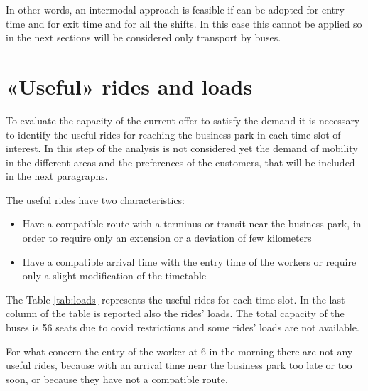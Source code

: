 In other words, an intermodal approach is feasible if can be adopted for entry time and for exit time and for all the shifts. In this case this cannot be applied so in the next sections will be considered only transport by buses.
\newpage
\begin{figure}[!h]
\centering
{}\hfill


\end{figure}
\newpage

\section{«Useful» rides and loads}

To evaluate the capacity of the current offer to satisfy the demand it is necessary to identify the useful rides for reaching the business park in each time slot of interest.
In this step of the analysis is not considered yet the demand of mobility in the different areas and the preferences of the customers, that will be included in the next paragraphs.

The useful rides have two characteristics:

\begin{itemize}
    \item Have a compatible route with a terminus or transit near the business park, in order to require only an extension or a deviation of few kilometers
    \item Have a compatible arrival time with the entry time of the workers or require only a slight modification of the timetable
\end{itemize}

The Table \ref{tab:loads} represents the useful rides for each time slot. In the last column of the table is reported also the rides’ loads. The total capacity of the buses is 56 seats due to covid restrictions and some rides’ loads are not available.

For what concern the entry of the worker at 6 in the morning there are not any useful rides, because with an arrival time near the business park too late or too soon, or because they have not a compatible route.

